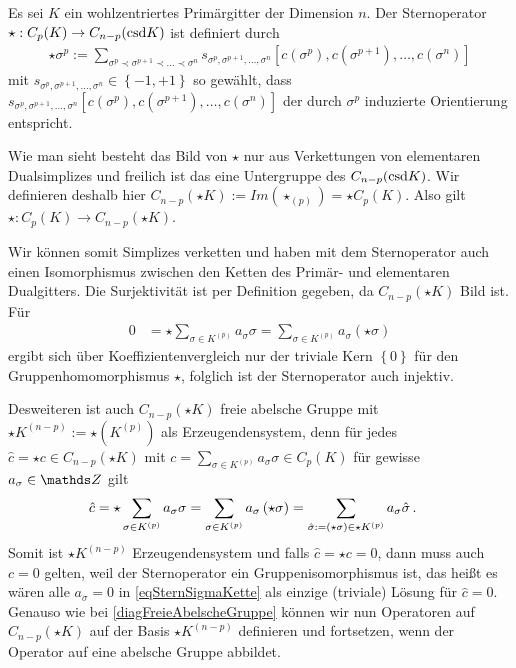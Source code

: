   \begin{definition}
     Es sei \( K \) ein wohlzentriertes Primärgitter der Dimension \( n \).
     Der Sternoperator \( \star: C_{p}(K) \rightarrow   C_{n-p}(\text{csd} K) \) ist definiert durch
     \begin{align}
       \star\sigma^{p} := \sum_{\sigma^{p} \prec \sigma^{p+1} \prec \ldots \prec \sigma^{n}}
                                                   s_{\sigma^{p}, \sigma^{p+1}, \ldots, \sigma^{n}} \left[ c(\sigma^{p}), c(\sigma^{p+1}), \ldots, c(\sigma^{n}) \right]
     \end{align}
     mit \( s_{\sigma^{p}, \sigma^{p+1}, \ldots, \sigma^{n}} \in \left\{ -1,+1 \right\}\) so gewählt, dass  
     \( s_{\sigma^{p}, \sigma^{p+1}, \ldots, \sigma^{n}} \left[ c(\sigma^{p}), c(\sigma^{p+1}), \ldots, c(\sigma^{n}) \right] \) der
     durch \( \sigma^{p} \) induzierte Orientierung entspricht.
  \end{definition}
  Wie man sieht besteht das Bild von \( \star \) nur aus Verkettungen von elementaren Dualsimplizes und freilich ist das eine Untergruppe des \( C_{n-p}(\text{csd} K) \).
  Wir definieren deshalb hier \( C_{n-p}(\star K) := Im(\star_{(p)}) = \star C_{p}(K) \).
  Also gilt \( \star: C_{p}(K) \rightarrow   C_{n-p}(\star K) \).

  Wir können somit Simplizes verketten und haben mit dem Sternoperator auch einen Isomorphismus
  zwischen den Ketten des Primär- und elementaren Dualgitters.
  Die Surjektivität ist per Definition gegeben, da \( C_{n-p}(\star K) \) Bild ist.
  Für
  \begin{align}
    0 &= \star \sum_{\sigma \in K^{(p)}} a_{\sigma}\sigma = \sum_{\sigma \in K^{(p)}} a_{\sigma} \left( \star\sigma\right)
  \end{align}
  ergibt sich über Koeffizientenvergleich nur der triviale Kern \( \left\{ 0 \right\} \) für den Gruppenhomomorphismus \( \star \), 
  folglich ist der Sternoperator auch injektiv.
  
  Desweiteren ist auch \( C_{n-p}(\star K) \) freie abelsche Gruppe mit 
  \mbox{\( \star K^{(n-p)} := \star\left( K^{(p)} \right) \)} als Erzeugendensystem, 
  denn für jedes \( \hat{c} = \star c \in C_{n-p}(\star K) \) mit \( c = \sum_{\sigma \in K^{(p)}} a_{\sigma}\sigma \in C_{p}(K) \) für gewisse \( a_{\sigma} \in \Z \) gilt
  \begin{align}
    \label{eqSternSigmaKette}
    \hat{c} &= \star \sum_{\sigma \in K^{(p)}} a_{\sigma}\sigma
             = \sum_{\sigma \in K^{(p)}} a_{\sigma} \left( \star\sigma\right)
             = \sum_{\hat{\sigma}:=\left( \star\sigma\right) \in \star K^{(p)} } a_{\sigma} \hat{\sigma} \,\text{.}
  \end{align}
  Somit ist \(\star K^{(n-p)}  \) Erzeugendensystem und falls \( \hat{c} = \star c = 0 \), 
  dann muss auch \( c = 0 \) gelten, weil der Sternoperator ein Gruppenisomorphismus ist,
  das heißt es wären alle \( a_{\sigma} = 0 \) in \eqref{eqSternSigmaKette} als einzige (triviale) Lösung für \( \hat{c} = 0 \).
  Genauso wie bei \eqref{diagFreieAbelscheGruppe} können wir nun Operatoren auf \( C_{n-p}(\star K) \) auf der Basis \( \star K^{(n-p)} \) definieren und fortsetzen, 
  wenn der Operator auf eine abelsche Gruppe abbildet.

